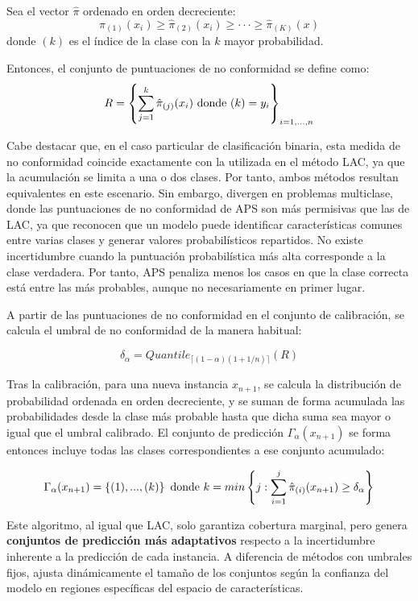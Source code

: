 Sea el vector $\hat{\pi}$ ordenado en orden decreciente: 
$$
\hat{\pi}_{(1)}(x_i) \ge \hat{\pi}_{(2)}(x_i) \ge \cdot\cdot\cdot \ge \hat{\pi}_{(K)}(x)
$$
donde $(k)$ es el índice de la clase con la $k$ mayor probabilidad.

Entonces, el conjunto de puntuaciones de no conformidad se define como:
$$
R = \left\{ \sum_{j=1}^k \hat{\pi}_{(j)}(x_i) \textnormal{ donde } (k)=y_i \right\}_{i=1,...,n}
$$

Cabe destacar que, en el caso particular de clasificación binaria, esta medida de no conformidad coincide 
exactamente con la utilizada en el método LAC, ya que la acumulación se limita a una o dos clases. Por tanto, 
ambos métodos resultan equivalentes en este escenario. Sin embargo, divergen en problemas multiclase, donde 
las puntuaciones de no conformidad de APS son más permisivas que las de LAC, ya que reconocen que un modelo 
puede identificar características comunes entre varias clases y generar valores probabilísticos repartidos.
No existe incertidumbre cuando la puntuación probabilística más alta corresponde a la clase verdadera. 
Por tanto, APS penaliza menos los casos en que la clase correcta está entre las más probables, aunque no 
necesariamente en primer lugar.

A partir de las puntuaciones de no conformidad en el conjunto de calibración, se calcula el umbral de no 
conformidad de la manera habitual:

$$
\delta_\alpha = Quantile_{ \lceil  (1-\alpha) (1 + 1/n)  \rceil } ( R )
$$

Tras la calibración, para una nueva instancia $x_{n+1}$, se calcula la distribución de probabilidad ordenada
en orden decreciente, y se suman de forma acumulada las probabilidades desde la clase más probable hasta 
que dicha suma sea mayor o igual que el umbral calibrado. El conjunto de predicción $\Gamma_\alpha(x_{n+1})$
se forma entonces incluye todas las clases correspondientes a ese conjunto acumulado: 

$$
\Gamma_\alpha(x_{n+1}) = \left\{ (1),...,(k) \right\} \\ \textnormal{ donde } 
k = min\left\{ j: \sum_{i=1}^{j} \hat{\pi}_{(i)}(x_{n+1}) \ge \delta_\alpha \right\} 
$$

Este algoritmo, al igual que LAC, solo garantiza cobertura marginal, pero genera \textbf{conjuntos de 
predicción más adaptativos} respecto a la incertidumbre inherente a la predicción de cada instancia. 
A diferencia de métodos con umbrales fijos, ajusta dinámicamente el tamaño de los conjuntos según la 
confianza del modelo en regiones específicas del espacio de características.

